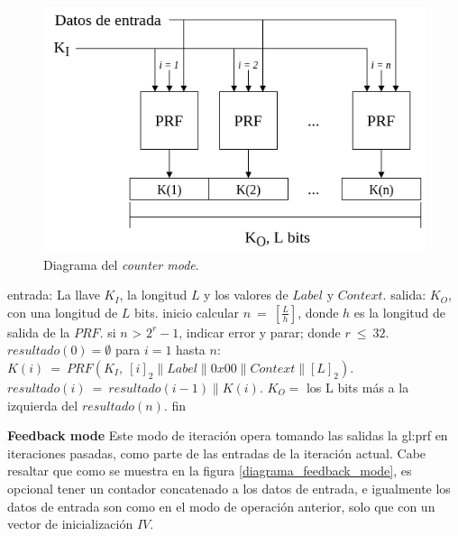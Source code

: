 \begin{figure}[H]
  \begin{center}
    \includegraphics[width=0.75\linewidth]{diagramas/counter_mode}
    \caption{Diagrama del \textit{counter mode}.}
    \label{diagrama_counter_mode}
   \end{center}
\end{figure}

\begin{pseudocodigo}[caption={Funcionamiento del \textit{counter mode}.}, 
label={mi:1}]
  entrada:   La llave $K_I$, la longitud $L$ y los valores de $Label$ y $Context$.
  salida:    $K_O$, con una longitud de $L$ bits.
  inicio
    calcular $n\: =\: [\frac{L}{h}]$, donde $h$ es la longitud de salida de la $PRF$.
    si $n$ > $2^r-1$, indicar error y parar; donde $r\: \leq\: 32$.
    $resultado(0) = \emptyset$
    para $i=1$ hasta $n$:
      $K(i)\: =\: PRF(K_I,\: {[i]}_2 \parallel Label \parallel 0x00 \parallel Context \parallel {[L]}_2 )$.
      $resultado(i)\: =\: resultado(i-1) \parallel K(i)$.
    $K_O =$ los L bits más a la izquierda del $resultado(n)$.
  fin
\end{pseudocodigo}

\textbf{Feedback mode}
Este modo de iteración opera tomando las salidas la \gls{gl:prf} en 
iteraciones pasadas, como parte de las entradas de la iteración actual.
Cabe resaltar que como se muestra en la figura \ref{diagrama_feedback_mode}, 
es opcional tener un contador concatenado a los datos de entrada, e igualmente 
los datos de entrada son como en el modo de operación anterior, solo que con 
un vector de inicialización $IV$.

